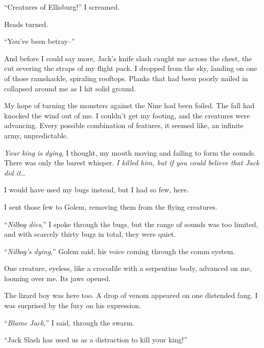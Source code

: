 ``Creatures of Ellisburg!'' I screamed.



Heads turned.



``You've been betray--''



And before I could say more, Jack's knife slash caught me across the chest, the cut severing the straps of my flight pack.  I dropped from the sky, landing on one of those ramshackle, spiraling rooftops.  Planks that had been poorly nailed in collapsed around me as I hit solid ground.



My hope of turning the monsters against the Nine had been foiled.  The fall had knocked the wind out of me.  I couldn't get my footing, and the creatures were advancing.  Every possible combination of features, it seemed like, an infinite army, unpredictable.



\emph{Your king is dying}, I thought, my mouth moving and failing to form the sounds.  There was only the barest whisper.  \emph{I killed him, but if you could believe that Jack did it}\ldots



I would have used my bugs instead, but I had so few, here.



I sent those few to Golem, removing them from the flying creatures.



``\emph{Nilbog dies},'' I spoke through the bugs, but the range of sounds was too limited, and with scarcely thirty bugs in total, they were quiet.



``\emph{Nilbog's dying},'' Golem said, his voice coming through the comm system.



One creature, eyeless, like a crocodile with a serpentine body, advanced on me, looming over me.  Its jaws opened.



The lizard boy was here too.  A drop of venom appeared on one distended fang.  I was surprised by the fury on his expression.



``\emph{Blame Jack},'' I said, through the swarm.



``Jack Slash has used us as a distraction to kill your king!''



